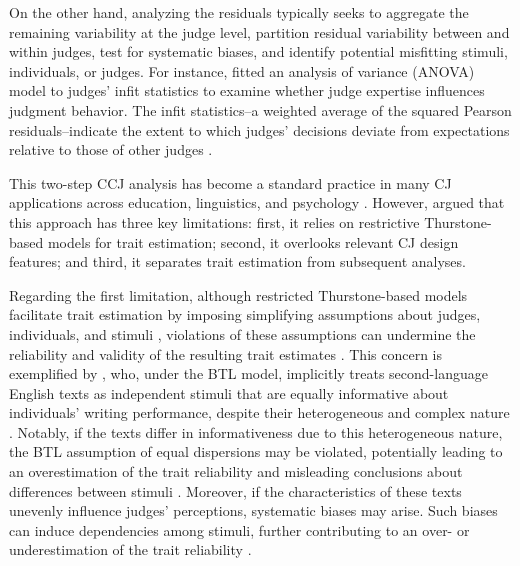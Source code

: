 \documentclass[
  authoryear,
  review,
  1p]{elsarticle}
\begin{document}
On the other hand, analyzing the residuals typically seeks to aggregate
the remaining variability at the judge level, partition residual
variability between and within judges, test for systematic biases, and
identify potential misfitting stimuli, individuals, or judges. For
instance, \citet{Wu_2025} fitted an analysis of variance (ANOVA) model
to judges' infit statistics to examine whether judge expertise
influences judgment behavior. The infit statistics--a weighted average
of the squared Pearson residuals--indicate the extent to which judges'
decisions deviate from expectations relative to those of other judges
\citep{Wright_et_al_1982}.

This two-step CCJ analysis has become a standard practice in many CJ
applications across education, linguistics, and psychology \citep[see,
e.g.,][]{Wu_2025, Thwaites_et_al_2024, Maydeu-Olivares_et_al_2005}.
However, \citet{Rivera_et_al_2025} argued that this approach has three
key limitations: first, it relies on restrictive Thurstone-based models
for trait estimation; second, it overlooks relevant CJ design features;
and third, it separates trait estimation from subsequent analyses.

Regarding the first limitation, although restricted Thurstone-based
models facilitate trait estimation by imposing simplifying assumptions
about judges, individuals, and stimuli
\citep{Thurstone_1927b, Bramley_2008}, violations of these assumptions
can undermine the reliability and validity of the resulting trait
estimates \citep{Perron_et_al_2015, Rivera_et_al_2025}. This concern is
exemplified by \citet{Wu_2025}, who, under the BTL model, implicitly
treats second-language English texts as independent stimuli that are
equally informative about individuals' writing performance, despite
their heterogeneous and complex nature
\citep{Thurstone_1927a, Andrich_1978, Bramley_2008, Kelly_et_al_2022}.
Notably, if the texts differ in informativeness due to this
heterogeneous nature, the BTL assumption of equal dispersions may be
violated, potentially leading to an overestimation of the trait
reliability and misleading conclusions about differences between stimuli
\citep{McElreath_2020, Wu_et_al_2022}. Moreover, if the characteristics
of these texts unevenly influence judges' perceptions, systematic biases
may arise. Such biases can induce dependencies among stimuli, further
contributing to an over- or underestimation of the trait reliability
\citep{vanderLinden_et_al_2017_II, Ackerman_1989, Hoyle_et_al_2023}.
\end{document}
